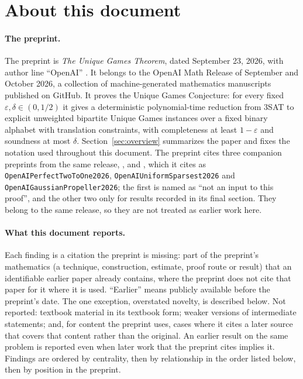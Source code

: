 \documentclass[11pt]{article}
\newcounter{finding}
\begin{document}
\tableofcontents

\section{About this document}\label{sec:about}

\paragraph{The preprint.}
The preprint is \emph{The Unique Games Theorem}, dated September 23, 2026, with author line
``OpenAI'' \cite{OAI-Preprint}. It belongs to the OpenAI Math Release of
September and October 2026, a collection of machine-generated mathematics
manuscripts published on GitHub. It proves the Unique Games Conjecture: for every
fixed $\varepsilon,\delta\in(0,1/2)$ it gives a deterministic polynomial-time
reduction from 3SAT to explicit unweighted bipartite Unique Games instances over
a fixed binary alphabet with translation constraints, with completeness at least
$1-\varepsilon$ and soundness at most $\delta$.
Section~\ref{sec:overview} summarizes the paper and fixes the notation used
throughout this document. The preprint cites three companion
preprints from the same release, \cite{OAI-Companion1}, \cite{OAI-Companion2} and
\cite{OAI-Companion3}, which it cites as \texttt{OpenAIPerfectTwoToOne2026},
\texttt{OpenAIUniformSparsest2026} and \texttt{OpenAIGaussianPropeller2026}; the
first is named as ``not an input to this proof'', and the other two only for
results recorded in its final section. They belong to the same release, so they
are not treated as earlier work here.

\paragraph{What this document reports.}
Each finding is a citation the preprint is missing: part of the preprint's
mathematics (a technique, construction, estimate, proof route or result) that
an identifiable earlier paper already contains, where the preprint does not
cite that paper for it where it is used. ``Earlier'' means publicly available
before the preprint's date. The one exception, overstated novelty, is
described below. Not reported: textbook material in its textbook form; weaker versions of
intermediate statements; and, for content the preprint uses, cases where it
cites a later source that covers that content rather than the original. An
earlier result on the same problem is reported even when later work that the
preprint cites implies it. Findings are ordered by centrality, then by relationship in
the order listed below, then by position in the preprint.
\end{document}
